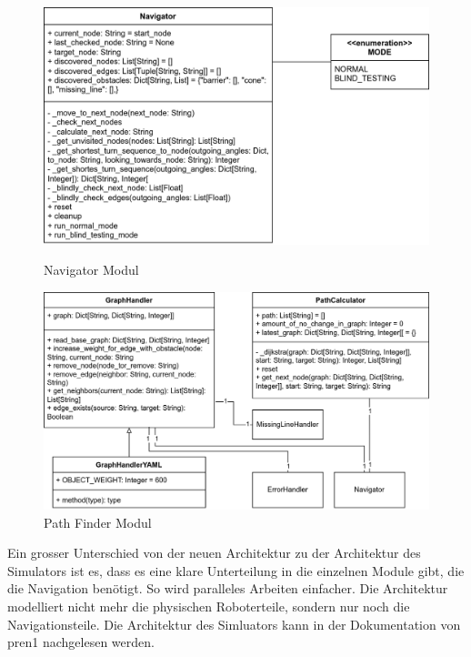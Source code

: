 \begin{figure}[H]
  \centering
    \begin{minipage}[b]{0.48\textwidth}
    \centering
    \includegraphics[width=\textwidth]{assets/IT/robot-sw-architecture-navigator.png}
    \caption{Navigator Modul}
    \label{fig:nav-navigator}
  \end{minipage}
  \hfill
  \begin{minipage}[b]{0.48\textwidth}
    \centering
    \includegraphics[width=\textwidth]{assets/IT/robot-sw-architecture-path_finder.png}
    \caption{Path Finder Modul}
    \label{fig:nav-pathfinder}
  \end{minipage}
\end{figure}

Ein grosser Unterschied von der neuen Architektur zu der Architektur des Simulators ist es, dass es eine klare Unterteilung in die einzelnen Module gibt, die die Navigation benötigt. So wird paralleles Arbeiten einfacher. Die Architektur modelliert nicht mehr die physischen Roboterteile, sondern nur noch die Navigationsteile. Die Architektur des Simluators kann in der Dokumentation von \acrshort{pren1} nachgelesen werden.

